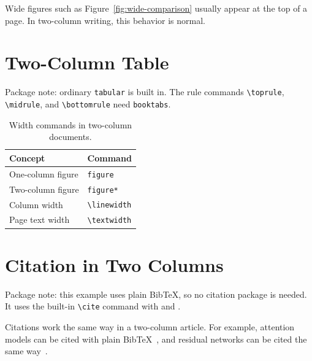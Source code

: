\documentclass[10pt,a4paper,twocolumn]{article}
\begin{document}
Wide figures such as Figure~\ref{fig:wide-comparison} usually appear at the
top of a page. In two-column writing, this behavior is normal.

\section{Two-Column Table}

{\raggedright
Package note: ordinary \texttt{tabular} is built in. The rule commands
\verb|\toprule|, \verb|\midrule|, and \verb|\bottomrule| need
\texttt{booktabs}.
\par}

\begin{table}[ht]
    \centering
    \begin{tabular}{ll}
        \toprule
        Concept & Command \\
        \midrule
        One-column figure & \texttt{figure} \\
        Two-column figure & \texttt{figure*} \\
        Column width & \verb|\linewidth| \\
        Page text width & \verb|\textwidth| \\
        \bottomrule
    \end{tabular}
    \caption{Width commands in two-column documents.}
    \label{tab:two-column-widths}
\end{table}

\section{Citation in Two Columns}

Package note: this example uses plain BibTeX, so no citation package is needed.
It uses the built-in \verb|\cite| command with \verb|| and
\verb||.

{\raggedright
Citations work the same way in a two-column article. For example, attention
models can be cited with plain BibTeX~\cite{vaswani2017attention}, and residual
networks can be cited the same way~\cite{he2016deep}.
\par}



\end{document}
